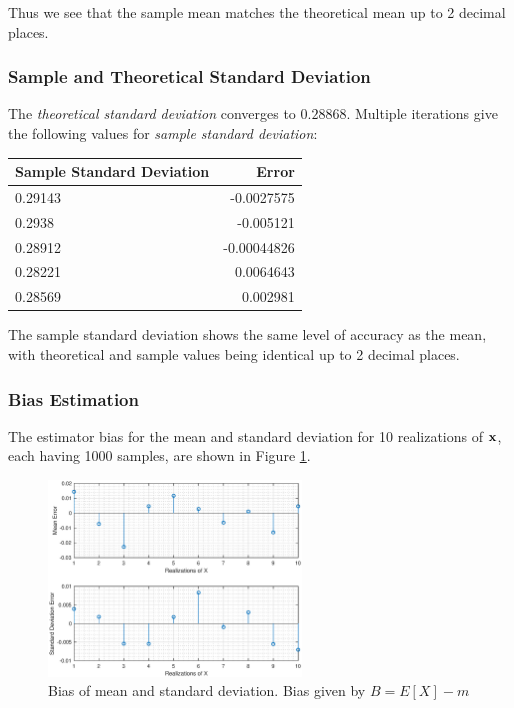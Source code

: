 \documentclass{article}
\begin{document}
Thus we see that the sample mean matches the theoretical mean up to 2 decimal places.

\subsubsection{Sample and Theoretical Standard Deviation}

The \textit{theoretical standard deviation} converges to $0.28868$. Multiple iterations give the following values for \textit{sample standard deviation}:

\begin{table}[h!]
\centering
\begin{tabular}{|l|r|} \hline

Sample Standard Deviation	&Error \\ \hline
0.29143						&-0.0027575	\\ \hline
0.2938						&-0.005121	\\ \hline
0.28912						&-0.00044826	\\ \hline
0.28221						&0.0064643 \\ \hline
0.28569						&0.002981	\\ \hline
\end{tabular}
\end{table}

The sample standard deviation shows the same level of accuracy as the mean, with theoretical and sample values being identical up to 2 decimal places.

\pagebreak

\subsubsection{Bias Estimation}

The estimator bias for the mean and standard deviation for 10 realizations of $\bf x$, each having 1000 samples, are shown in Figure \ref{fig:bias_norm}.

\begin{figure}[h!]
\centering
\includegraphics[width=0.6\textwidth]{bias_norm}
\caption{\label{fig:bias_norm} Bias of mean and standard deviation. Bias given by $B = E[X]-m$}
\end{figure}
\end{document}
